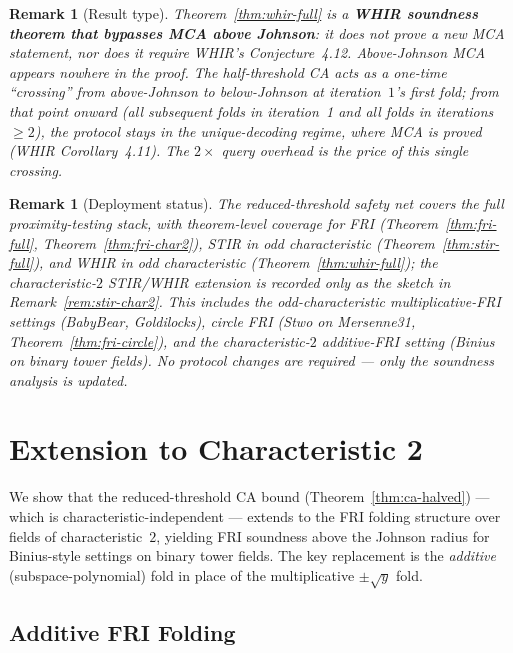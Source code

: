 \documentclass[11pt]{article}
\newtheorem{remark}[theorem]{Remark}
\begin{document}
\begin{remark}[Result type]
\label{rem:whir-result-type}
Theorem~\ref{thm:whir-full} is a \textbf{WHIR soundness theorem that bypasses MCA above Johnson}: it does not prove a new MCA statement, nor does it require WHIR's Conjecture~4.12. Above-Johnson MCA appears nowhere in the proof. The half-threshold CA acts as a \emph{one-time} ``crossing'' from above-Johnson to below-Johnson at iteration~$1$'s first fold; from that point onward (all subsequent folds in iteration~1 and all folds in iterations $\geq 2$), the protocol stays in the unique-decoding regime, where MCA is proved (WHIR Corollary~4.11). The $2\times$ query overhead is the price of this single crossing.
\end{remark}

\begin{remark}[Deployment status]
The reduced-threshold safety net covers the full proximity-testing stack, with theorem-level coverage for FRI (Theorem~\ref{thm:fri-full}, Theorem~\ref{thm:fri-char2}), STIR in odd characteristic (Theorem~\ref{thm:stir-full}), and WHIR in odd characteristic (Theorem~\ref{thm:whir-full}); the characteristic-$2$ STIR/WHIR extension is recorded only as the sketch in Remark~\ref{rem:stir-char2}. This includes the odd-characteristic multiplicative-FRI settings (BabyBear, Goldilocks), circle FRI (Stwo on Mersenne31, Theorem~\ref{thm:fri-circle}), and the characteristic-$2$ additive-FRI setting (Binius on binary tower fields). No protocol changes are required --- only the soundness analysis is updated.
\end{remark}


\section{Extension to Characteristic 2}
\label{app:char2}

We show that the reduced-threshold CA bound (Theorem~\ref{thm:ca-halved}) --- which is characteristic-independent --- extends to the FRI folding structure over fields of characteristic~$2$, yielding FRI soundness above the Johnson radius for Binius-style settings on binary tower fields. The key replacement is the \emph{additive} (subspace-polynomial) fold in place of the multiplicative $\pm\sqrt{y}$ fold.

\subsection{Additive FRI Folding}
\end{document}
